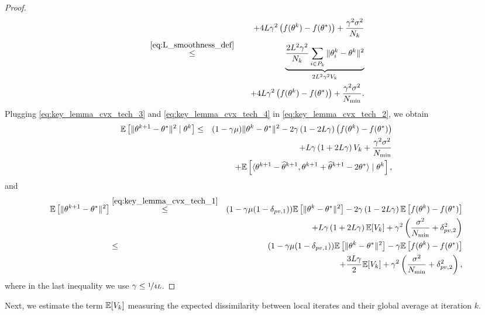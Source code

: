 \begin{proof}
\begin{eqnarray}
    &&\quad + 4L\gamma^2\left(f(\theta^k) - f(\theta^*)\right) + \frac{\gamma^2\sigma^2}{N_k}\notag\\
    &\overset{\eqref{eq:L_smoothness_def}}{\le}& \underbrace{\frac{2L^2\gamma^2}{N_k}\sum\limits_{i\in P_k}\|\theta_i^k - \theta^k\|^2}_{2L^2\gamma^2 V_k}\notag\\
    &&\quad + 4L\gamma^2\left(f(\theta^k) - f(\theta^*)\right) + \frac{\gamma^2\sigma^2}{N_{\min}}. \label{eq:key_lemma_cvx_tech_4}
\end{eqnarray}
Plugging \eqref{eq:key_lemma_cvx_tech_3} and \eqref{eq:key_lemma_cvx_tech_4} in \eqref{eq:key_lemma_cvx_tech_2}, we obtain
\begin{eqnarray}
    \mathbb{E}\left[\|\theta^{k+1} - \theta^*\|^2\mid \theta^k\right] &\le& (1-\gamma\mu)\|\theta^k - \theta^*\|^2 - 2\gamma\left(1 - 2L\gamma\right)\left(f(\theta^k) - f(\theta^*)\right)\notag\\
    &&\quad + L\gamma\left(1+2L\gamma\right)V_k + \frac{\gamma^2\sigma^2}{N_{\min}} \notag\\
    &&\quad +  \mathbb{E}\left[\langle\theta^{k+1} - \widehat{\theta}^{k+1}, \theta^{k+1}+\widehat{\theta}^{k+1} - 2\theta^*\rangle\mid \theta^k\right], \notag
\end{eqnarray}
and
\begin{eqnarray}
    \mathbb{E}\left[\|\theta^{k+1} - \theta^*\|^2\right] &\overset{\eqref{eq:key_lemma_cvx_tech_1}}{\le}& (1-\gamma\mu(1-\delta_{pv,1}))\mathbb{E}\left[\|\theta^k - \theta^*\|^2\right] - 2\gamma\left(1 - 2L\gamma\right)\mathbb{E}\left[f(\theta^k) - f(\theta^*)\right]\notag\\
    &&\quad+ L\gamma\left(1+2L\gamma\right)\mathbb{E}[V_k] + \gamma^2\left(\frac{\sigma^2}{N_{\min}} + \delta_{pv,2}^2\right)\notag\\
    &\le& (1-\gamma\mu(1-\delta_{pv,1}))\mathbb{E}\left[\|\theta^k - \theta^*\|^2\right] - \gamma\mathbb{E}\left[f(\theta^k) - f(\theta^*)\right]\notag\\
    &&\quad+ \frac{3L\gamma}{2}\mathbb{E}[V_k] + \gamma^2\left(\frac{\sigma^2}{N_{\min}} + \delta_{pv,2}^2\right),\notag
\end{eqnarray}
where in the last inequality we use $\gamma \le \nicefrac{1}{4L}$.
\end{proof}

Next, we estimate the term $\mathbb{E}[V_k]$ measuring the expected dissimilarity between local iterates and their global average at iteration $k$.

